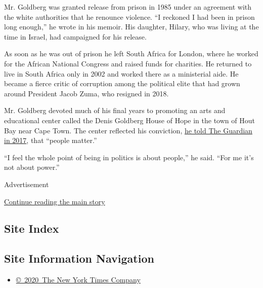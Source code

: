 Mr. Goldberg was granted release from prison in 1985 under an agreement
with the white authorities that he renounce violence. ``I reckoned I had
been in prison long enough,'' he wrote in his memoir. His daughter,
Hilary, who was living at the time in Israel, had campaigned for his
release.

As soon as he was out of prison he left South Africa for London, where
he worked for the African National Congress and raised funds for
charities. He returned to live in South Africa only in 2002 and worked
there as a ministerial aide. He became a fierce critic of corruption
among the political elite that had grown around President Jacob Zuma,
who resigned in 2018.

Mr. Goldberg devoted much of his final years to promoting an arts and
educational center called the Denis Goldberg House of Hope in the town
of Hout Bay near Cape Town. The center reflected his conviction,
\href{https://www.theguardian.com/global-development/2017/nov/12/denis-goldberg-south-africa-anc-nelson-mandela-jacob-zuma}{he
told The Guardian in 2017}, that ``people matter.''

``I feel the whole point of being in politics is about people,'' he
said. ``For me it's not about power.''

Advertisement

\protect\hyperlink{after-bottom}{Continue reading the main story}

\hypertarget{site-index}{%
\subsection{Site Index}\label{site-index}}

\hypertarget{site-information-navigation}{%
\subsection{Site Information
Navigation}\label{site-information-navigation}}

\begin{itemize}
\tightlist
\item
  \href{https://help.nytimes.com/hc/en-us/articles/115014792127-Copyright-notice}{©~2020~The
  New York Times Company}
\end{itemize}

